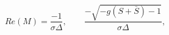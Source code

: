 \begin{equation}
Re(M) = \frac{-1}{\sigma \Delta}, \qquad 
\frac{-\sqrt{-g(S+ \bar S)-1}}{\sigma \Delta},
\end{equation}

